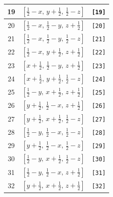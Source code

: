 \documentclass[fleqn,8pt]{jsarticle}
\begin{document}
\begin{longtable}{ccc}
19 & $\left[ \frac{1}{2} - x,\, y + \frac{1}{2},\, \frac{1}{2} - z \right]$ & {\tt [19]} \\ \hline
20 & $\left[ \frac{1}{2} - x,\, \frac{1}{2} - y,\, z + \frac{1}{2} \right]$ & {\tt [20]} \\ \hline
21 & $\left[ \frac{1}{2} - x,\, \frac{1}{2} - y,\, \frac{1}{2} - z \right]$ & {\tt [21]} \\ \hline
22 & $\left[ \frac{1}{2} - x,\, y + \frac{1}{2},\, z + \frac{1}{2} \right]$ & {\tt [22]} \\ \hline
23 & $\left[ x + \frac{1}{2},\, \frac{1}{2} - y,\, z + \frac{1}{2} \right]$ & {\tt [23]} \\ \hline
24 & $\left[ x + \frac{1}{2},\, y + \frac{1}{2},\, \frac{1}{2} - z \right]$ & {\tt [24]} \\ \hline
25 & $\left[ \frac{1}{2} - y,\, x + \frac{1}{2},\, z + \frac{1}{2} \right]$ & {\tt [25]} \\ \hline
26 & $\left[ y + \frac{1}{2},\, \frac{1}{2} - x,\, z + \frac{1}{2} \right]$ & {\tt [26]} \\ \hline
27 & $\left[ y + \frac{1}{2},\, x + \frac{1}{2},\, \frac{1}{2} - z \right]$ & {\tt [27]} \\ \hline
28 & $\left[ \frac{1}{2} - y,\, \frac{1}{2} - x,\, \frac{1}{2} - z \right]$ & {\tt [28]} \\ \hline
29 & $\left[ y + \frac{1}{2},\, \frac{1}{2} - x,\, \frac{1}{2} - z \right]$ & {\tt [29]} \\ \hline
30 & $\left[ \frac{1}{2} - y,\, x + \frac{1}{2},\, \frac{1}{2} - z \right]$ & {\tt [30]} \\ \hline
31 & $\left[ \frac{1}{2} - y,\, \frac{1}{2} - x,\, z + \frac{1}{2} \right]$ & {\tt [31]} \\ \hline
32 & $\left[ y + \frac{1}{2},\, x + \frac{1}{2},\, z + \frac{1}{2} \right]$ & {\tt [32]} \\
\end{longtable}
\end{document}

